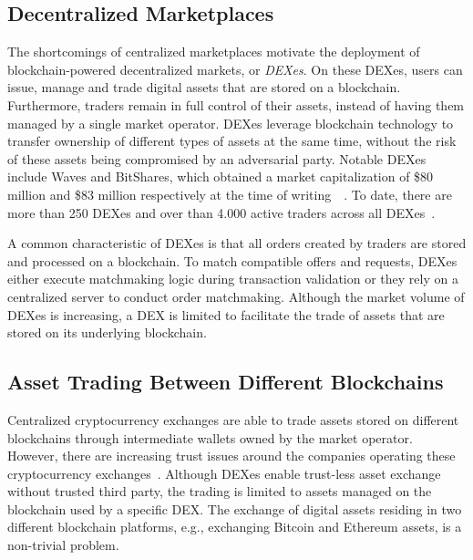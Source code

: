 \subsection{Decentralized Marketplaces}
The shortcomings of centralized marketplaces motivate the deployment of blockchain-powered decentralized markets, or \emph{DEXes}.
On these DEXes, users can issue, manage and trade digital assets that are stored on a blockchain.
Furthermore, traders remain in full control of their assets, instead of having them managed by a single market operator.
DEXes leverage blockchain technology to transfer ownership of different types of assets at the same time, without the risk of these assets being compromised by an adversarial party.
Notable DEXes include Waves and BitShares, which obtained a market capitalization of \$80 million and \$83 million respectively at the time of writing~\cite{wavesplatform}~\cite{schuh2015bitshares}.
To date, there are more than 250 DEXes and over than 4.000 active traders across all DEXes~\cite{han2019optionality}.

A common characteristic of DEXes is that all orders created by traders are stored and processed on a blockchain.
To match compatible offers and requests, DEXes either execute matchmaking logic during transaction validation or they rely on a centralized server to conduct order matchmaking.
Although the market volume of DEXes is increasing, a DEX is limited to facilitate the trade of assets that are stored on its underlying blockchain.


\subsection{Asset Trading Between Different Blockchains}
Centralized cryptocurrency exchanges are able to trade assets stored on different blockchains through intermediate wallets owned by the market operator.
However, there are increasing trust issues around the companies operating these cryptocurrency exchanges~\cite{chohan2018problems}.
Although DEXes enable trust-less asset exchange without trusted third party, the trading is limited to assets managed on the blockchain used by a specific DEX.
The exchange of digital assets residing in two different blockchain platforms, e.g., exchanging Bitcoin and Ethereum assets, is a non-trivial problem.

